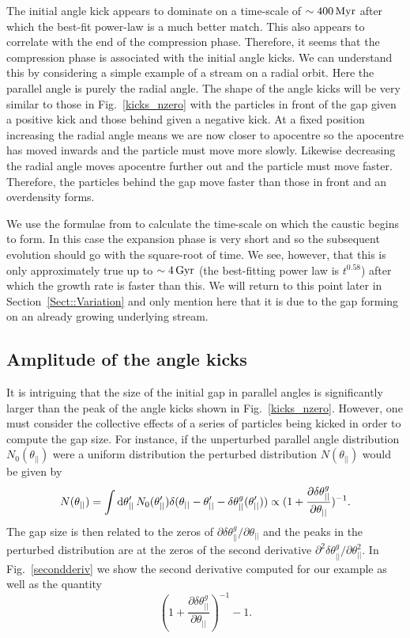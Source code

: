 \documentclass[useAMS,usenatbib,fleqn,a4paper]{mn2e}
\def\Gyr{\,{\rm Gyr}}
\def\Myr{\,{\rm Myr}}
\begin{document}
The initial angle kick appears to dominate on a time-scale of $\sim400\Myr$ after which the best-fit power-law is a much better match. This also appears to correlate with the end of the compression phase. Therefore, it seems that the compression phase is associated with the initial angle kicks. We can understand this by considering a simple example of a stream on a radial orbit. Here the parallel angle is purely the radial angle. The shape of the angle kicks will be very similar to those in Fig.~\ref{kicks_nzero} with the particles in front of the gap given a positive kick and those behind given a negative kick. At a fixed position increasing the radial angle means we are now closer to apocentre so the apocentre has moved inwards and the particle must move more slowly. Likewise decreasing the radial angle moves apocentre further out and the particle must move faster. Therefore, the particles behind the gap move faster than those in front and an overdensity forms.

We use the formulae from \cite{ErkalBelokurov2015} to calculate the time-scale on which the caustic begins to form. In this case the expansion phase is very short and so the subsequent evolution should go with the square-root of time. We see, however, that this is only approximately true up to $\sim4\Gyr$ (the best-fitting power law is $t^{0.58}$) after which the growth rate is faster than this. We will return to this point later in Section~\ref{Sect::Variation} and only mention here that it is due to the gap forming on an already growing underlying stream.

\subsection{Amplitude of the angle kicks}

It is intriguing that the size of the initial gap in parallel angles is significantly larger than the peak of the angle kicks shown in Fig.~\ref{kicks_nzero}. However, one must consider the collective effects of a series of particles being kicked in order to compute the gap size. For instance, if the unperturbed parallel angle distribution $N_0(\theta_{||})$ were a uniform distribution the perturbed distribution $N(\theta_{||})$ would be given by
\begin{equation}
N(\theta_{||})=\int {\rm d}\theta'_{||}\,N_0(\theta'_{||})\delta(\theta_{||}-\theta'_{||}-\delta\theta^g_{||}(\theta'_{||}))\propto(1+\frac{\partial\delta\theta^g_{||}}{\partial\theta_{||}})^{-1}.
\label{UniformAssump}
\end{equation}
The gap size is then related to the zeros of $\partial\delta\theta^g_{||}/\partial\theta_{||}$
and the peaks in the perturbed distribution are at the zeros of the second derivative
$
\partial^2\delta\theta^g_{||}/\partial\theta^{2}_{||}.
$
In Fig.~\ref{secondderiv} we show the second derivative computed for our example as well as the quantity
\begin{equation}
(1+\frac{\partial\delta\theta^g_{||}}{\partial\theta_{||}})^{-1}-1.
\label{deriv}
\end{equation}
\end{document}
